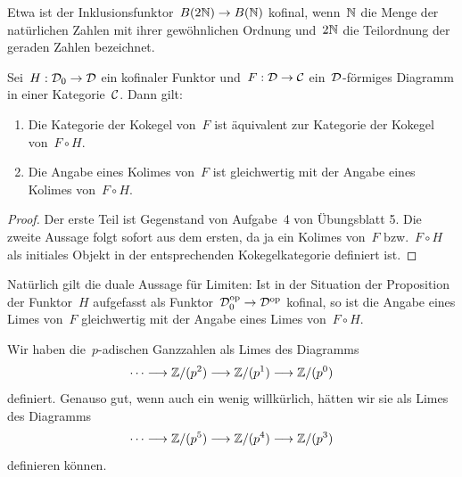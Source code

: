 Etwa ist der Inklusionsfunktor~$B (2\mathbb{N}) \to B(\mathbb{N})$ kofinal, wenn~$\mathbb{N}$ die
Menge der natürlichen Zahlen mit ihrer gewöhnlichen Ordnung und~$2\mathbb{N}$ die
Teilordnung der geraden Zahlen bezeichnet.

\begin{prop}
Sei~$H : \mathcal{D}_0 \to \mathcal{D}$ ein kofinaler Funktor und~$F : \mathcal{D} \to \mathcal{C}$
ein~$\mathcal{D}$-förmiges Diagramm in einer Kategorie~$\mathcal{C}$. Dann gilt:
\begin{enumerate}
\item Die Kategorie der Kokegel von~$F$ ist äquivalent zur Kategorie der
Kokegel von~$F \circ H$.
\item Die Angabe eines Kolimes von~$F$ ist gleichwertig mit der Angabe eines
Kolimes von~$F \circ H$.
\end{enumerate}
\end{prop}
\begin{proof}
Der erste Teil ist Gegenstand von Aufgabe~4 von Übungsblatt 5. Die zweite
Aussage folgt sofort aus dem ersten, da ja ein Kolimes von~$F$ bzw.~$F \circ H$
als initiales Objekt in der entsprechenden Kokegelkategorie definiert ist.
\end{proof}

Natürlich gilt die duale Aussage für Limiten: Ist in der Situation der
Proposition der Funktor~$H$ aufgefasst als Funktor~$\mathcal{D}_0^{\mathrm{op}} \to \mathcal{D}^{\mathrm{op}}$
kofinal, so ist die Angabe eines Limes von~$F$ gleichwertig mit der Angabe
eines Limes von~$F \circ H$.

\begin{bsp}Wir haben die~$p$-adischen Ganzzahlen als Limes des Diagramms
\[ \cdots \longrightarrow \mathbb{Z}/(p^2) \longrightarrow \mathbb{Z}/(p^1) \longrightarrow \mathbb{Z}/(p^0) \]
definiert. Genauso gut, wenn auch ein wenig willkürlich, hätten wir sie als
Limes des Diagramms
\[ \cdots \longrightarrow \mathbb{Z}/(p^5) \longrightarrow \mathbb{Z}/(p^4) \longrightarrow \mathbb{Z}/(p^3) \]
definieren können.\end{bsp}





